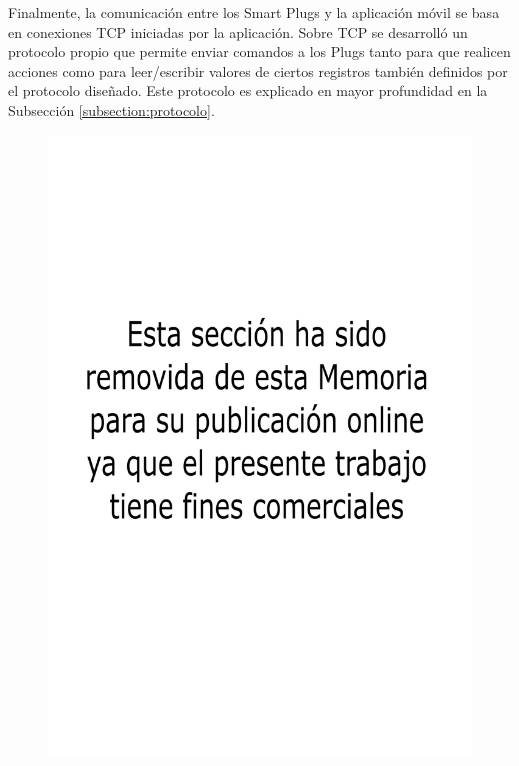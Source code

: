 Finalmente, la comunicación entre los Smart Plugs y la aplicación móvil se basa en conexiones TCP iniciadas por la aplicación. Sobre TCP se desarrolló un protocolo propio que permite enviar comandos a los Plugs tanto para que realicen acciones como para leer/escribir valores de ciertos registros también definidos por el protocolo diseñado. Este protocolo es explicado en mayor profundidad en la Subsección \ref{subsection:protocolo}.



\begin{figure}[!h]
	\centering
	\includegraphics[width=14cm]{./Figures/comercial.png}
\end{figure}



